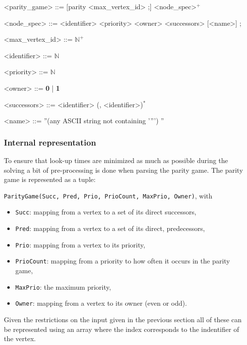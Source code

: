 \documentclass[10pt,a4paper]{article}
\begin{document}
\begin{center}
	\begin{minipage}{0.8\linewidth}
		\begin{grammar}
			<parity\_game> ::= [parity <max\_vertex\_id> ;] <node_spec>$^{+}$
			
			<node\_spec> ::= <identifier> <priority> <owner> <successors> [<name>] ;
			
      		<max\_vertex\_id> ::= $\mathbb{N}^+$
      		
      		<identifier> ::= $\mathbb{N}$
      		
      		<priority> ::= $\mathbb{N}$
      		
      		<owner> ::= \textbf{0} | \textbf{1}
      		
      		<successors> ::= <identifier> (, <identifier>)$^{*}$
      		
      		<name> ::= \textquotedblright (any ASCII string not containing \rq \textquotedblright \rq ) \textquotedblright
    \end{grammar}
  \end{minipage}
\end{center}

\subsubsection{Internal representation}
To ensure that look-up times are minimized as much as possible during the solving a bit of pre-processing is done when parsing the parity game. The parity game is represented as a tuple: 

\texttt{ParityGame(Succ, Pred, Prio, PrioCount, MaxPrio, Owner)}, with


\begin{itemize}
	\item \texttt{Succ}: mapping from a vertex to a set of its direct successors,
	\item \texttt{Pred}: mapping from a vertex to a set of its direct, predecessors,
	\item \texttt{Prio}: mapping from a vertex to its priority,
	\item \texttt{PrioCount}: mapping from a priority to how often it occurs in the parity game,
	\item \texttt{MaxPrio}: the maximum priority,
	\item \texttt{Owner}: mapping from a vertex to its owner (even or odd).
\end{itemize}

Given the restrictions on the input given in the previous section all of these can be represented using an array where the index corresponds to the indentifier of the vertex.
\end{document}

